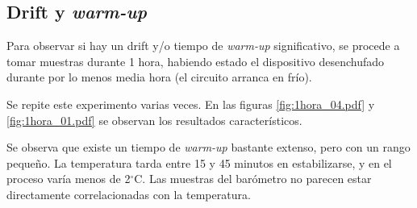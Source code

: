 \documentclass[main]{subfiles}
\newcommand{\degc}{$^\circ$C}
\begin{document}
\subsection{Drift y \textit{warm-up}}
\label{sec:drift-y-warm-up}

Para observar si hay un drift y/o tiempo de \textit{warm-up} significativo, se procede a tomar muestras durante 1 hora, habiendo estado el dispositivo desenchufado durante por lo menos media hora (el circuito arranca en fr\'io).

Se repite este experimento varias veces. En las figuras \ref{fig:1hora_04.pdf} y \ref{fig:1hora_01.pdf} se observan los resultados caracter\'isticos.

\begin{figure}[h!]
\hspace{-50pt}
\caption{}
\end{figure}
\vspace{-10pt}

Se observa que existe un tiempo de \textit{warm-up} bastante extenso, pero con un rango peque\~no. La temperatura tarda entre 15 y 45 minutos en estabilizarse, y en el proceso var\'ia menos de 2\degc. Las muestras del bar\'ometro no parecen estar directamente correlacionadas con la temperatura.
\end{document}
